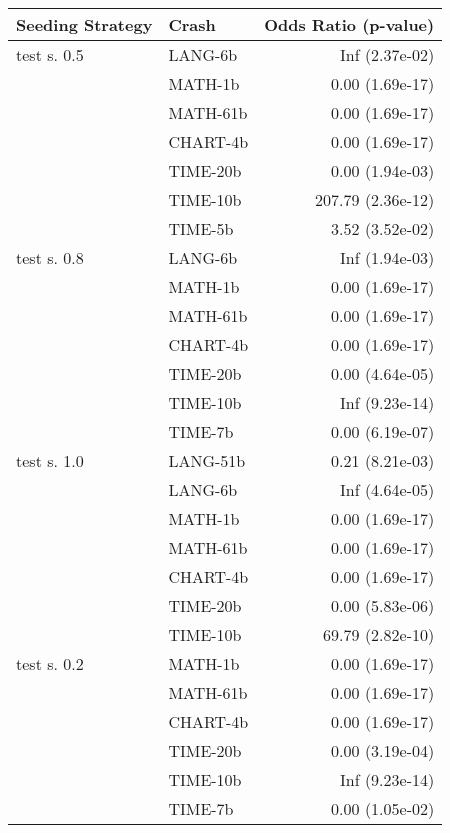 \begin{tabular}{ l | l | r}
\hline 
\textbf{Seeding Strategy} & \textbf{Crash} & \textbf{Odds Ratio (p-value)} \\ 
\hline 
test s. 0.5 & LANG-6b & Inf (2.37e-02)\\ 
 & MATH-1b & 0.00 (1.69e-17)\\ 
 & MATH-61b & 0.00 (1.69e-17)\\ 
 & CHART-4b & 0.00 (1.69e-17)\\ 
 & TIME-20b & 0.00 (1.94e-03)\\ 
 & TIME-10b & 207.79 (2.36e-12)\\ 
 & TIME-5b & 3.52 (3.52e-02)\\ 
\hline 
test s. 0.8 & LANG-6b & Inf (1.94e-03)\\ 
 & MATH-1b & 0.00 (1.69e-17)\\ 
 & MATH-61b & 0.00 (1.69e-17)\\ 
 & CHART-4b & 0.00 (1.69e-17)\\ 
 & TIME-20b & 0.00 (4.64e-05)\\ 
 & TIME-10b & Inf (9.23e-14)\\ 
 & TIME-7b & 0.00 (6.19e-07)\\ 
\hline 
test s. 1.0 & LANG-51b & 0.21 (8.21e-03)\\ 
 & LANG-6b & Inf (4.64e-05)\\ 
 & MATH-1b & 0.00 (1.69e-17)\\ 
 & MATH-61b & 0.00 (1.69e-17)\\ 
 & CHART-4b & 0.00 (1.69e-17)\\ 
 & TIME-20b & 0.00 (5.83e-06)\\ 
 & TIME-10b & 69.79 (2.82e-10)\\ 
\hline 
test s. 0.2 & MATH-1b & 0.00 (1.69e-17)\\ 
 & MATH-61b & 0.00 (1.69e-17)\\ 
 & CHART-4b & 0.00 (1.69e-17)\\ 
 & TIME-20b & 0.00 (3.19e-04)\\ 
 & TIME-10b & Inf (9.23e-14)\\ 
 & TIME-7b & 0.00 (1.05e-02)\\ 
\hline 
\end{tabular}